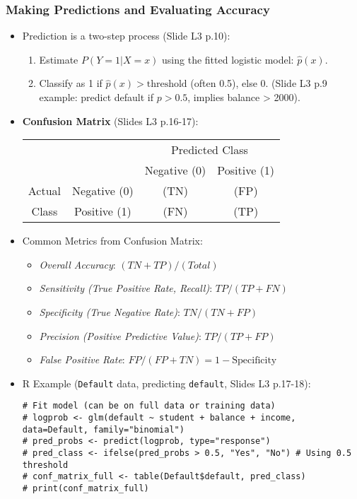 \documentclass[12pt,a4paper]{article}
\newcommand{\Robject}[1]{\texttt{#1}} %
\begin{document}
\begin{itemize}
    \subsubsection{Making Predictions and Evaluating Accuracy }
        \begin{itemize}
            \item Prediction is a two-step process (Slide L3 p.10):
                \begin{enumerate}
                    \item Estimate $P(Y=1|X=x)$ using the fitted logistic model: $\hat{p}(x)$.
                    \item Classify as 1 if $\hat{p}(x) > \text{threshold}$ (often 0.5), else 0. (Slide L3 p.9 example: predict default if $p > 0.5$, implies balance > 2000).
                \end{enumerate}
            \item \textbf{Confusion Matrix} (Slides L3 p.16-17):
                \begin{tabular}{cc|cc}
                & & \multicolumn{2}{c}{Predicted Class} \\
                & & Negative (0) & Positive (1) \\ \hline
                Actual & Negative (0) &  (TN) &  (FP) \\
                Class & Positive (1) &  (FN) &  (TP) \\
                \end{tabular}
            \item Common Metrics from Confusion Matrix:
                \begin{itemize}
                    \item \textit{Overall Accuracy}: $(TN+TP) / (Total)$
                    \item \textit{Sensitivity (True Positive Rate, Recall)}: $TP / (TP+FN)$
                    \item \textit{Specificity (True Negative Rate)}: $TN / (TN+FP)$
                    \item \textit{Precision (Positive Predictive Value)}: $TP / (TP+FP)$
                    \item \textit{False Positive Rate}: $FP / (FP+TN) = 1 - \text{Specificity}$
                \end{itemize}
            \item R Example (\Robject{Default} data, predicting \Robject{default}, Slides L3 p.17-18):
\begin{lstlisting}[caption={Logistic Regression and Confusion Matrix (Slides L3 p.17-18)}]
# Fit model (can be on full data or training data)
# logprob <- glm(default ~ student + balance + income, data=Default, family="binomial")
# pred_probs <- predict(logprob, type="response")
# pred_class <- ifelse(pred_probs > 0.5, "Yes", "No") # Using 0.5 threshold
# conf_matrix_full <- table(Default$default, pred_class)
# print(conf_matrix_full)


\end{lstlisting}
\end{itemize}
\end{itemize}
\end{document}
